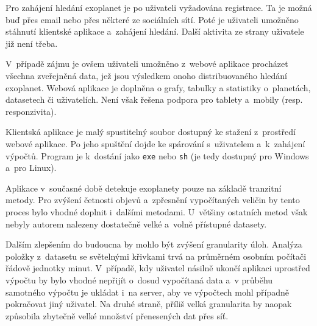 \documentclass[a4paper,12pt]{article}
\def\code#1{\texttt{#1}}
\begin{document}
{{{{{{{{{{{{{

Pro zahájení hledání exoplanet je po uživateli vyžadována registrace. Ta je možná buď přes email nebo přes některé ze sociálních sítí. Poté je uživateli umožněno stáhnutí klientské aplikace a~zahájení hledání. Další aktivita ze strany uživatele již není třeba.

V~případě zájmu je ovšem uživateli umožněno z~webové aplikace procházet všechna zveřejněná data, jež jsou výsledkem onoho distribuovaného hledání exoplanet. Webová aplikace je doplněna o grafy, tabulky a statistiky o~planetách, datasetech či uživatelích. Není však řešena podpora pro tablety a~mobily (resp. responzivita).

Klientská aplikace je malý spustitelný soubor dostupný ke stažení z~prostředí webové aplikace. Po jeho spuštění dojde ke spárování s~uživatelem a~k~zahájení výpočtů. Program je k~dostání jako \code{exe} nebo \code{sh} (je tedy dostupný pro Windows a~pro Linux).

Aplikace v~současné době detekuje exoplanety pouze na základě tranzitní metody. Pro zvýšení četnosti objevů a~zpřesnění vypočítaných veličin by tento proces bylo vhodné doplnit i~dalšími metodami. U~většiny ostatních metod však nebyly autorem nalezeny dostatečně velké a~volně přístupné datasety.

Dalším zlepšením do budoucna by mohlo být zvýšení granularity úloh. Analýza položky z~datasetu se světelnými křivkami trvá na průměrném osobním počítači řádově jednotky minut. V~případě, kdy uživatel násilně ukončí aplikaci uprostřed výpočtu by bylo vhodné nepřijít o~dosud vypočítaná data a~v průběhu samotného výpočtu je ukládat i~na server, aby ve výpočtech mohl případně pokračovat jiný uživatel. Na druhé straně, příliš velká granularita by naopak způsobila zbytečně velké množství přenesených dat přes síť.



}}}}}}}}}}}}}
\end{document}
